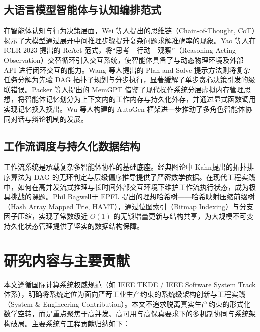 \subsection{大语言模型智能体与认知编排范式}
在智能体认知与行为决策层面，Wei 等人\cite{Wei2022CoT}提出的思维链（Chain-of-Thought, CoT）揭示了大模型通过展开中间推理步骤提升复杂问题求解准确率的现象。Yao 等人\cite{Yao2023ReAct}在 ICLR 2023 提出的 ReAct 范式，将“思考—行动—观察”（Reasoning-Acting-Observation）交替循环引入交互系统，使智能体具备了与动态物理环境及外部 API 进行闭环交互的能力。Wang 等人\cite{Wang2023PlanSolve}提出的 Plan-and-Solve 提示方法则将复杂任务分解为先验 DAG 拓扑子规划与分步执行，显著缓解了单步贪心决策引发的级联错误。Packer 等人\cite{Packer2023MemGPT}提出的 MemGPT 借鉴了现代操作系统分层虚拟内存管理思想，将智能体记忆划分为上下文内的工作内存与持久化外存，并通过显式函数调用实现记忆换入换出。Wu 等人\cite{Wu2023AutoGen}构建的 AutoGen 框架进一步推动了多角色智能体协同对话与辩论机制的发展。

\subsection{工作流调度与持久化数据结构}
工作流系统是承载复杂多智能体协作的基础底座。经典图论中 Kahn\cite{Kahn1962Topological}提出的拓扑排序算法为 DAG 的无环判定与层级偏序推导提供了严密数学依据。在现代工程实践中，如何在高并发流式推理与长时间外部交互环境下维护工作流执行状态，成为极具挑战的课题。Phil Bagwell\cite{Bagwell2001HAMT}于 EPFL 提出的理想哈希树——哈希映射压缩前缀树（Hash Array Mapped Trie, HAMT），通过位图索引（Bitmap Indexing）与分支因子压缩，实现了常数级近 $O(1)$ 的无锁增量更新与结构共享，为大规模不可变持久化状态管理提供了坚实的数据结构保障。

\section{研究内容与主要贡献}

本文遵循国际计算系统权威规范（如 IEEE TKDE / IEEE Software System Track 体系），明确将系统定位为面向严苛工业生产约束的系统级架构创新与工程实践（System \& Engineering Contribution）。本文不追求脱离真实生产约束的形式化数学空转，而是重点聚焦于高并发、高可用与高保真要求下的多机制协同与系统架构破局。主要系统与工程贡献归纳如下：

